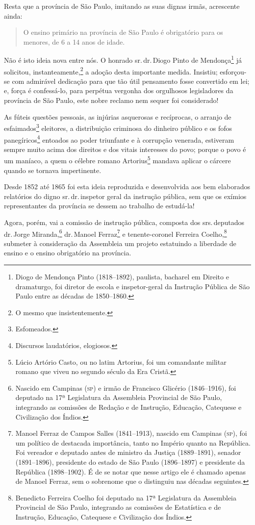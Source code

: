 Resta que a província de São Paulo, imitando as suas dignas irmãs,
acrescente ainda:


\begin{quote}
O ensino primário na província de São Paulo é obrigatório para os
menores, de 6 a 14 anos de idade.
\end{quote}

Não é isto ideia nova entre nós. O honrado sr.\,dr.\,Diogo Pinto de
Mendonça\footnote{Diogo de Mendonça Pinto (1818--1892), paulista,
  bacharel em Direito e dramaturgo, foi diretor de escola e
  inspetor-geral da Instrução Pública de São Paulo entre as décadas de
  1850--1860.} já solicitou, instanteamente,\footnote{O mesmo que
  insistentemente.} a adoção desta importante medida. Insistiu;
esforçou-se com admirável dedicação para que tão útil pensamento fosse
convertido em lei; e, força é confessá-lo, para perpétua vergonha dos
orgulhosos legisladores da província de São Paulo, este nobre reclamo nem
sequer foi considerado!

As fúteis questões pessoais, as injúrias asquerosas e recíprocas, o
arranjo de esfaimados\footnote{Esfomeados.} eleitores, a distribuição
criminosa do dinheiro público e os fofos panegíricos\footnote{
  Discursos laudatórios, elogiosos.} entoados ao poder triunfante e à
corrupção venerada, estiveram sempre muito acima dos direitos e dos
vitais interesses do povo; porque o povo é um maníaco, a quem o célebre
romano Artorius\footnote{Lúcio Artório Casto, ou no latim Artorius,
  foi um comandante militar romano que viveu no segundo século da Era
  Cristã.} mandava aplicar o cárcere quando se tornava impertinente.

Desde 1852 até 1865 foi esta ideia reproduzida e desenvolvida aos bem
elaborados relatórios do digno sr.\,dr.\,inspetor geral da instrução
pública, sem que os exímios representantes da província se dessem ao
trabalho de estudá-la!

Agora, porém, vai a comissão de instrução pública, composta dos srs.\,deputados dr.\,Jorge Miranda,\footnote{Nascido em Campinas (\textsc{sp}) e irmão
  de Francisco Glicério (1846--1916), foi deputado na 17ª Legislatura da
  Assembleia Provincial de São Paulo, integrando as comissões de Redação
  e de Instrução, Educação, Catequese e Civilização dos Índios.} dr.\,Manoel Ferraz\footnote{Manoel Ferraz de Campos Salles (1841--1913),
  nascido em Campinas (\textsc{sp}), foi um político de destacada importância,
  tanto no Império quanto na República. Foi vereador e deputado antes de
  ministro da Justiça (1889--1891), senador (1891--1896), presidente do
  estado de São Paulo (1896--1897) e presidente da República (1898--1902).
  É de se notar que nesse artigo ele é chamado apenas de Manoel Ferraz,
  sem o sobrenome que o distinguiu nas décadas seguintes.} e
tenente-coronel Ferreira Coelho,\footnote{Benedicto Ferreira Coelho foi
  deputado na 17ª Legislatura da Assembleia Provincial de São Paulo,
  integrando as comissões de Estatística e de Instrução, Educação,
  Catequese e Civilização dos Índios.} submeter à consideração da
Assembleia um projeto estatuindo a liberdade de ensino e o ensino
obrigatório na província.

